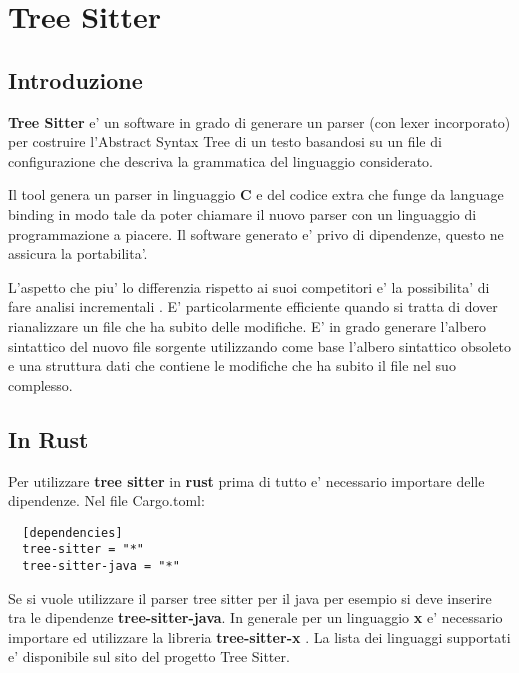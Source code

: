 \chapter{Tree Sitter}

\section{Introduzione}

\textbf{Tree Sitter} \cite{TreeSitter} e' un software in grado di generare un parser (con lexer incorporato) per costruire l'Abstract Syntax Tree di un testo basandosi su un file di configurazione che descriva la grammatica del linguaggio considerato.

Il tool \cite{TreeSitterCreatingParsers} genera un parser in linguaggio \textbf{C} e del codice extra che funge da language binding in modo tale da poter chiamare il nuovo parser con un linguaggio di programmazione a piacere.
Il software generato e' privo di dipendenze, questo ne assicura la portabilita'.

L'aspetto che piu' lo differenzia rispetto ai suoi competitori e' la possibilita' di fare analisi incrementali \cite{TreeSitterAdvancedParsing}.
E' particolarmente efficiente quando si tratta di dover rianalizzare un file che ha subito delle modifiche.
E' in grado generare l'albero sintattico del nuovo file sorgente utilizzando come base l'albero sintattico obsoleto e una struttura dati che contiene le modifiche che ha subito il file nel suo complesso.

\section{In Rust}

Per utilizzare \textbf{tree sitter} in \textbf{rust} \cite{TreeSitterCrate} prima di tutto e' necessario importare delle dipendenze. Nel file Cargo.toml:

\begin{verbatim}
  [dependencies]
  tree-sitter = "*"
  tree-sitter-java = "*"
\end{verbatim}

Se si vuole utilizzare il parser tree sitter per il java per esempio si deve inserire tra le dipendenze \textbf{tree-sitter-java}.
In generale per un linguaggio \textbf{x} e' necessario importare ed utilizzare la libreria \textbf{tree-sitter-x} \cite{TreeSitterRustGrammars}.
La lista dei linguaggi supportati e' disponibile sul sito del progetto Tree Sitter.

